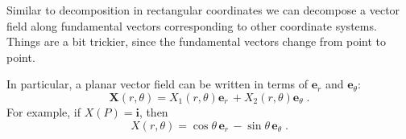 \begin{frame}
Similar to decomposition in rectangular coordinates
we can decompose a vector field along fundamental vectors
corresponding to other coordinate systems. Things are a bit
trickier, since the fundamental vectors change from
point to point.

In particular, a planar vector field can be written in terms of
$\textbf{e}_r$ and $\textbf{e}_\theta$:
%
$$\textbf{X}(r,\theta) = X_1(r,\theta) \textbf{e}_r\, +
X_2(r,\theta) \textbf{e}_\theta\; .$$
%
For example, if $X(P) = \textbf{i}$, then
%
$$X(r,\theta) = \cos\theta \,\textbf{e}_r\,
-\sin\theta \, \textbf{e}_\theta\; .$$
\end{frame}